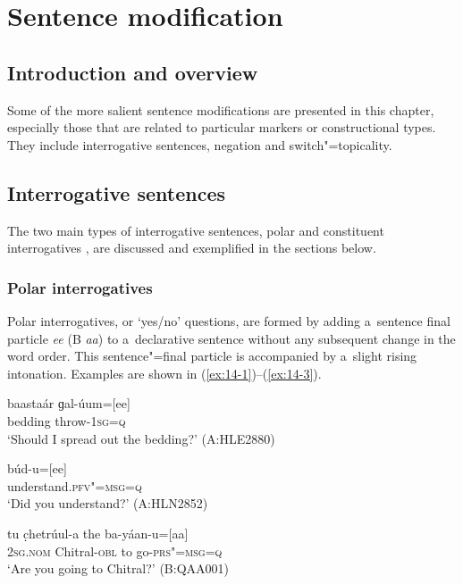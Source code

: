 \chapter{Sentence modification}
\label{chap:14}

\section{Introduction and overview}
\label{sec:14-1}


Some of the more salient sentence modifications are presented in this chapter, especially those that are related to particular markers or constructional types. They include interrogative sentences, negation and switch"=topicality.


\section{Interrogative sentences}
\label{sec:14-2}


The two main types of interrogative sentences, polar and constituent interrogatives \citep[290--303]{koenigsiemund2007}, are discussed and exemplified in the sections below. 


\subsection{Polar interrogatives}
\label{subsec:14-2-1}


Polar interrogatives, or `yes/no' questions, are formed by adding a~sentence final particle \textit{ee} (B \textit{aa}) to a~declarative sentence without any subsequent change in the word order. This sentence"=final particle is accompanied by a~slight rising intonation. Examples are shown in (\ref{ex:14-1})--(\ref{ex:14-3}).

\begin{exe}
\ex
\label{ex:14-1}
\gll baastaár ɡal-úum=[ee]  \\
bedding throw-\textsc{1sg=q} \\
\glt `Should I spread out the bedding?' (A:HLE2880)

\ex
\label{ex:14-2}
\gll búd-u=[ee] \\
understand.\textsc{pfv"=msg=q} \\
\glt `Did you understand?' (A:HLN2852)

\ex
\label{ex:14-3}
\gll tu c̣hetrúul-a the ba-yáan-u=[aa] \\
\textsc{2sg.nom} Chitral-\textsc{obl} to go-\textsc{prs"=msg=q} \\
\glt `Are you going to Chitral?' (B:QAA001)
\end{exe}

